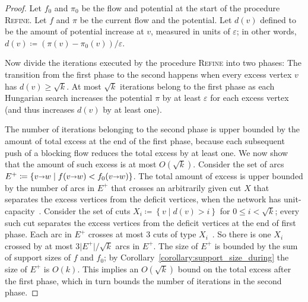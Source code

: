 \documentclass[a4paper,UKenglish]{socg-lipics-v2018}
\makeatletter
\def\note#1{\textcolor{red}{{#1}}}
\def\etal{\emph{et~al.}}
\def\etal{\textit{et~al.}}
\def\eps{\varepsilon}
\def\abs#1{\mathopen| #1 \mathclose|}		%
\def\Set#1{\left\{ #1 \right\}}
\def\arcto{\mathord\shortrightarrow}
\def\arc#1#2{#1\arcto#2}
\theoremstyle{plain}
\numberwithin{figure}{section}
\def\EMPH#1{\textcolor{BrickRed}{{\emph{#1}}}}
\def\n@te#1{\textsf{\boldmath \textbf{$\langle\!\langle$#1$\rangle\!\rangle$}}\leavevmode}
\def\note#1{\textcolor{red}{\n@te{#1}}}
\makeatother
\begin{document}
\begin{proof}
Let $f_0$ and $\pi_0$ be the flow and potential at the start of the procedure \textsc{Refine}.  Let $f$ and $\pi$ be the current flow and the potential.
Let \EMPH{$d(v)$} defined to be the amount of potential increase at $v$, measured in units of $\eps$; in other words, $d(v) \coloneqq (\pi(v) - \pi_0(v)) / \eps$.
%

Now divide the iterations executed by
the procedure \textsc{Refine}
into two phases:  The transition from the first phase to the second happens when every excess vertex $v$ has $d(v) \ge \sqrt{k}$.
%
At most $\sqrt{k}$ iterations belong to
the first phase as each Hungarian search increases the potential $\pi$ by at least $\eps$ for each excess vertex (and thus increases $d(v)$ by at least one).

The number of iterations
belonging to the second phase is upper bounded by the amount of total excess at the end of the first phase, because each subsequent push of a blocking flow reduces the total excess by at least one.  We now show that the amount of such excess is at most $O(\sqrt{k})$.
%
Consider the set of arcs $E^+ \coloneqq \Set{\arc vw \mid f(\arc vw) < f_0(\arc vw)}$.
The total amount of excess is upper bounded by the number of arcs in $E^+$ that crosses an arbitrarily given cut $X$ that separates the excess vertices from the deficit vertices, when the network has unit-capacity~\cite[Lemma~3.6]{GHKT17}.
%
Consider the set of cuts $X_i \coloneqq \Set{v \mid d(v) > i}$ for $0 \le i < \sqrt{k}$; every such cut separates the excess vertices from the deficit vertices at the end of first phase.
Each arc in $E^+$ crosses at most $3$ cuts of type $X_i$~\cite[Lemma~3.1]{GHKT17}.  So there is one $X_i$ crossed by at most $3\abs{E^+}/\sqrt{k}$ arcs in $E^+$.
%
The size of $E^+$ is bounded by the sum of support sizes of $f$ and $f_0$; by Corollary~\ref{corollary:support_size_during} the size of $E^+$ is $O(k)$.
This implies an $O(\sqrt{k})$ bound on the total excess after the first phase, which in turn bounds the number of iterations in the second phase.
\end{proof}
\end{document}
